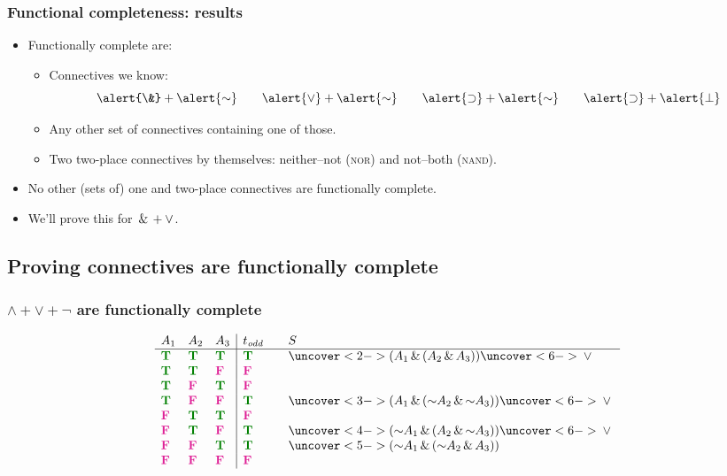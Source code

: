 \begin{frame}
  \frametitle{Functional completeness: results}

\begin{itemize}[<+->]
  \item Functionally complete are:
  \begin{itemize}[<+->]
  \item Connectives we know:
  \[
    {\alert{\&}} + {\alert{\enot}} \qquad 
  {\alert{\lor}} +
  {\alert{\enot}} \qquad 
  {\alert{\eif}} +
  {\alert{\enot}} \qquad {\alert{\eif}} +
  {\alert{\bot}}\] 
  \item Any other set of connectives containing one of those.
  \item Two two-place connectives by themselves: neither--not (\textsc{nor}) and not--both (\textsc{nand}).
  \end{itemize}
  \item No other (sets of) one and two-place connectives are functionally complete.
  \item We'll prove this for $\,\&\, + \vee$.
\end{itemize}
\end{frame}


\subsection{Proving connectives are functionally complete}

\begin{frame}
  \frametitle{$\land + \lor + \lnot$ are functionally complete}
\[
\begin{array}{lll|l@{\qquad}l}
A_1 & A_2 & A_3 & t_\mathit{odd} & S \\
\hline
\True & \True & \True & \True & \uncover<2->{(A_1 \land (A_2 \land A_3))} \uncover<6->{{}\lor{}}\\
\True & \True & \False & \False \\
\True & \False & \True & \False \\
\True & \False & \False & \True & \uncover<3->{(A_1 \land (\lnot A_2 \land \lnot A_3))} \uncover<6->{{}\lor{}}\\
\False & \True & \True & \False \\
\False & \True & \False & \True & \uncover<4->{(\lnot A_1 \land (A_2 \land \lnot A_3))} \uncover<6->{{}\lor{}}\\
\False & \False & \True & \True & \uncover<5->{(\lnot A_1 \land (\lnot A_2 \land A_3))}\\
\False & \False & \False & \False
\end{array}\]
\end{frame}


